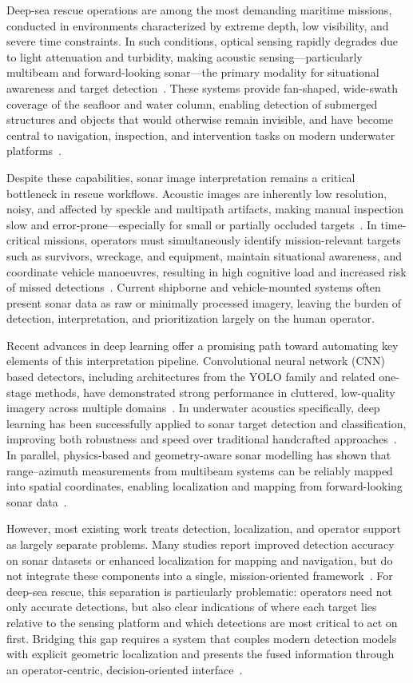 \documentclass[conference]{IEEEtran}
\begin{document}
Deep-sea rescue operations are among the most demanding maritime missions, conducted in environments characterized by extreme depth, low visibility, and severe time constraints. In such conditions, optical sensing rapidly degrades due to light attenuation and turbidity, making acoustic sensing---particularly multibeam and forward-looking sonar---the primary modality for situational awareness and target detection~\cite{ref2, ref6}. These systems provide fan-shaped, wide-swath coverage of the seafloor and water column, enabling detection of submerged structures and objects that would otherwise remain invisible, and have become central to navigation, inspection, and intervention tasks on modern underwater platforms~\cite{ref2, ref4}.

Despite these capabilities, sonar image interpretation remains a critical bottleneck in rescue workflows. Acoustic images are inherently low resolution, noisy, and affected by speckle and multipath artifacts, making manual inspection slow and error-prone---especially for small or partially occluded targets~\cite{ref7}. In time-critical missions, operators must simultaneously identify mission-relevant targets such as survivors, wreckage, and equipment, maintain situational awareness, and coordinate vehicle manoeuvres, resulting in high cognitive load and increased risk of missed detections~\cite{ref4, ref20}. Current shipborne and vehicle-mounted systems often present sonar data as raw or minimally processed imagery, leaving the burden of detection, interpretation, and prioritization largely on the human operator.

Recent advances in deep learning offer a promising path toward automating key elements of this interpretation pipeline. Convolutional neural network (CNN) based detectors, including architectures from the YOLO family and related one-stage methods, have demonstrated strong performance in cluttered, low-quality imagery across multiple domains~\cite{ref8, ref9}. In underwater acoustics specifically, deep learning has been successfully applied to sonar target detection and classification, improving both robustness and speed over traditional handcrafted approaches~\cite{ref7, ref11}. In parallel, physics-based and geometry-aware sonar modelling has shown that range--azimuth measurements from multibeam systems can be reliably mapped into spatial coordinates, enabling localization and mapping from forward-looking sonar data~\cite{ref3, ref5}.

However, most existing work treats detection, localization, and operator support as largely separate problems. Many studies report improved detection accuracy on sonar datasets or enhanced localization for mapping and navigation, but do not integrate these components into a single, mission-oriented framework~\cite{ref7, ref20}. For deep-sea rescue, this separation is particularly problematic: operators need not only accurate detections, but also clear indications of where each target lies relative to the sensing platform and which detections are most critical to act on first. Bridging this gap requires a system that couples modern detection models with explicit geometric localization and presents the fused information through an operator-centric, decision-oriented interface~\cite{ref3, ref4}.
\end{document}
